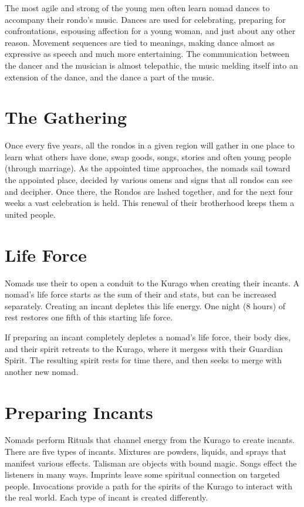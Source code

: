 \begin{multicols*}{2}
The most agile and strong of the young men often learn nomad dances to accompany their rondo's music. Dances are used for celebrating, preparing for confrontations, espousing affection for a young woman, and just about any other reason. Movement sequences are tied to meanings, making dance almost as expressive as speech and much more entertaining. The communication between the dancer and the musician is almost telepathic, the music melding itself into an extension of the dance, and the dance a part of the music.

\section{The Gathering}

Once every five years, all the rondos in a given region will gather in one place to learn what others have done, swap goods, songs, stories and often young people
(through marriage). As the appointed time approaches, the nomads sail toward the appointed place, decided by various omens and signs that all rondos can see and decipher. Once there, the Rondos are lashed together, and for the next four weeks a vast celebration is held. This renewal of their brotherhood keeps them a united people.

\section{Life Force}

Nomads use their  to open a conduit to the Kurago when creating their incants. A nomad's life force starts as the sum of their \HEA and \PER stats, but can be increased separately. Creating an incant depletes this life energy. One night (8 hours) of rest restores one fifth of this starting life force.

If preparing an incant completely depletes a nomad's life force, their body dies, and their spirit retreats to the Kurago, where it mergess with their Guardian Spirit. The resulting spirit rests for time there, and then seeks to merge with another new nomad.

\section{Preparing Incants}

Nomads perform Rituals that channel energy from the Kurago to create incants. There are five types of incants. Mixtures are powders, liquids, and sprays that manifest various effects. Talisman are objects with bound magic. Songs effect the listeners in many ways. Imprints leave some spiritual connection on targeted people. Invocations provide a path for the spirits of the Kurago to interact with the real world. Each type of incant is created differently.


\end{multicols*}
